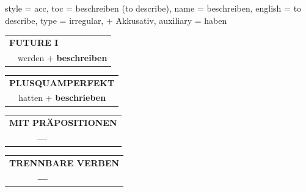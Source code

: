 \begin{verbentry}{
  style = {acc},
  toc = {beschreiben (to describe)},
  name = {beschreiben},
  english = {to describe},
  type = {irregular, + Akkusativ},
  auxiliary = {haben}
}
\begin{tabular}{rl}
    \multicolumn{2}{l}{\textbf{FUTURE I} }\\
   & werden + \textbf{beschreiben}\\
 
  \end{tabular}
\hfill
   \begin{tabular}{rl}
      \multicolumn{2}{l}{\textbf{PLUSQUAMPERFEKT}}\\
   & hatten + \textbf{beschrieben}\\
  \end{tabular}
  
\vspace{10pt}

\begin{tabular}{lll}
\multicolumn{3}{l}{\textbf{MIT PRÄPOSITIONEN}}\\
& \textbf{---} & \\
\end{tabular}
\hfill
\begin{tabular}{lll}
\multicolumn{3}{l}{\textbf{TRENNBARE VERBEN}}\\
& \textbf{---} & \\
\end{tabular}

  \vspace{-5pt}
\end{verbentry}

